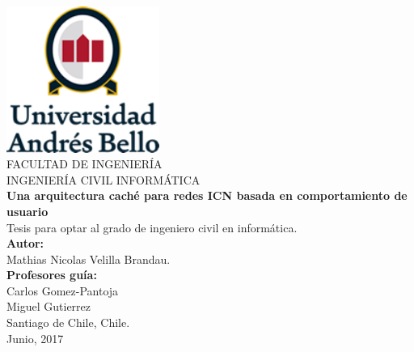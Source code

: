 \documentclass[12pt]{ociamthesis}  %
\begin{document}
\begin{titlepage}
	\begin{center}
		\includegraphics[width=5cm]{logo2.png}\\
		\vspace{1cm}
		FACULTAD DE INGENIERÍA\\
		INGENIERÍA CIVIL INFORMÁTICA\\
		\vspace{1cm}
		\LARGE{\textbf{Una arquitectura caché para redes ICN basada en comportamiento de usuario} \\}
		\vspace{1cm}
		\small{Tesis para optar al grado de ingeniero civil en informática.}\\
		\vspace{2cm}
		\textbf{Autor:} \\
		Mathias Nicolas Velilla Brandau.\\
		\vspace{1cm}
		\textbf{Profesores guía:} \\
		Carlos Gomez-Pantoja\\
		Miguel Gutierrez\\
		\vspace{1cm}
		Santiago de Chile, Chile.\\
		\vspace{1cm}
		Junio, 2017
	\end{center}
\end{titlepage}


\begin{romanpages}          %
\tableofcontents            %
\listoffigures              %
\listoftables %
\end{romanpages}            %
\end{document}
